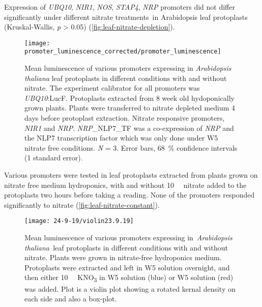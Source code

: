 Expression of \textit{UBQ10}, \textit{NIR1}, \textit{NOS}, \textit{STAP4}, \textit{NRP} promoters did not differ significantly under different nitrate treatments~in Arabidopsis leaf protoplasts (Kruskal\hyp{}Wallis, \textit{p} \textgreater{} 0.05) (\autoref{fig:leaf-nitrate-depletion}).

\begin{figure}[!h]
\begin{center}
\capstart
\texttt{[image: promoter\_luminescence\_corrected/promoter\_luminescence]}
\caption{
Mean luminescence of various promoters expressing in \textit{Arabidopsis thaliana} leaf protoplasts in different conditions with and without nitrate. The experiment calibrator for all promoters was \textit{UBQ10}:LucF. Protoplasts extracted from 8 week old hydoponically grown plants. Plants were transferred to nitrate depleted medium 4 days before protoplast extraction. Nitrate responsive promoters, \textit{NIR1}
and \textit{NRP}. \textit{NRP}\_NLP7\_TF was a co\hyp{}expression of \textit{NRP} and the NLP7 transcription factor which was only done under W5 nitrate free conditions. \textit{N} = 3. Error bars, \SI{68}{\percent} confidence intervals (1 standard error).
\label{fig:leaf-nitrate-depletion}
}
\end{center}
\end{figure}

Various promoters were tested in leaf protoplasts extracted from plants grown on nitrate free medium hydroponics, with and without \SI{10}{\milli\Molar} nitrate added to the protoplasts two hours before taking a reading. None of the promoters responded significantly to nitrate
(\autoref{fig:leaf-nitrate-constant}).
\begin{figure}[!ht]
\begin{center}
\capstart
\texttt{[image: 24-9-19/violin23.9.19]}
\caption{
Mean luminescence of various promoters expressing in~\textit{Arabidopsis
thaliana~}leaf protoplasts in different conditions with and without
nitrate. Plants were grown in nitrate\hyp{}free hydroponics medium.
Protoplasts were extracted and left in W5 solution overnight, and then
either \SI{10}{\milli\Molar} KNO\textsubscript{3} in W5 solution (blue) or W5 solution
(red) was added. Plot is a violin plot showing a rotated kernal density
on each side and also a box\hyp{}plot.
\label{fig:leaf-nitrate-constant}
}
\end{center}
\end{figure}



